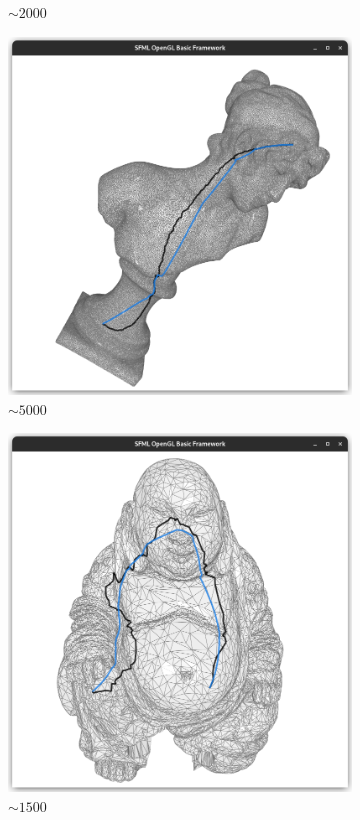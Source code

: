 \documentclass{stdlocal}
\begin{document}
\begin{figure}
\begin{subfigure}[b]{0.24\linewidth}
    \caption{$\sim 2000$}
  \end{subfigure}
  \begin{subfigure}[b]{0.24\linewidth}
    \centering
    \includegraphics[width=\linewidth,trim={25px 20 25 50},clip]{images/sappho-geodesic-1.png}
    \caption{$\sim 5000$}
  \end{subfigure}
  \begin{subfigure}[b]{0.24\linewidth}
    \centering
    \includegraphics[width=\linewidth,trim={25px 20 25 50},clip]{images/buddha-geodesic-1.png}
    \caption{$\sim 1500$}
  \end{subfigure}
  \caption[]{}
  \label{fig:}
\end{figure}
\end{document}
